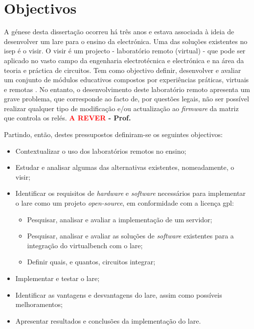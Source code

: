 \section{Objectivos}
\label{sec:Objectivos}
A génese desta dissertação ocorreu há três anos e estava associada à ideia de desenvolver um \acrfull{lare} para o ensino da electrónica. Uma das soluções existentes no \acrfull{isep} é o \acrfull{visir}.
O \acrshort{visir} é um projecto - laboratório remoto (virtual) - que pode ser aplicado no vasto campo da engenharia electrotécnica e electrónica e na área da teoria e práctica de circuitos. Tem como objectivo definir, desenvolver e avaliar um conjunto de módulos educativos compostos por experiências práticas, virtuais e remotas \cite{visirisep}.
No entanto, o desenvolvimento deste laboratório remoto apresenta um grave problema, que corresponde ao facto de, por questões legais, não ser possível realizar qualquer tipo de modificação e/ou actualização ao \textit{firmware} da matriz que controla os relés. \textbf{\textcolor{red}{A REVER} - Prof.}

Partindo, então, destes pressupostos definiram-se os seguintes objectivos:
\begin{itemize}
    \item Contextualizar o uso dos laboratórios remotos no ensino;
    \item Estudar e analisar algumas das alternativas existentes, nomeadamente, o \acrshort{visir};
    \item Identificar os requisitos de \textit{hardware} e \textit{software} necessários para implementar o \acrshort{lare} como um projeto \textit{open-source}, em conformidade com a licença \acrfull{gpl}:
    \begin{itemize}
        \item Pesquisar, analisar e avaliar a implementação de um servidor;
        \item Pesquisar, analisar e avaliar as soluções de \textit{software} existentes para a integração do \acrfull{virtualbench} com o \acrshort{lare};
         \item Definir quais, e quantos, circuitos integrar;
    \end{itemize}
    \item Implementar e testar o \acrshort{lare};
    \item Identificar as vantagens e desvantagens do \acrshort{lare}, assim como possíveis melhoramentos;
    \item Apresentar resultados e conclusões da implementação do \acrshort{lare}.
\end{itemize}


